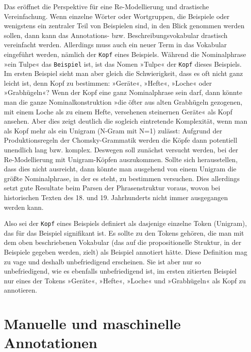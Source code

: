\documentclass{article}
\newcommand*{\vokabular}{\texttt}%
\begin{document}
Das eröffnet die Perspektive für eine Re-Modellierung und drastische
Vereinfachung. Wenn einzelne Wörter oder Wortgruppen, die Beispiele
oder wenigstens ein zentraler Teil von Beispielen sind, in den Blick
genommen werden sollen, dann kann das Annotations-
bzw. Beschreibungsvokabular drastisch vereinfacht werden. Allerdings
muss auch ein neuer Term in das Vokabular eingeführt werden, nämlich
der \vokabular{Kopf} eines Beispiels. Während die Nominalphrase »ein
Tulpe« das \vokabular{Beispiel} ist, ist das Nomen »Tulpe« der
\vokabular{Kopf} dieses Beispiels. Im ersten Beispiel sieht man aber
gleich die Schwierigkeit, dass es oft nicht ganz leicht ist, denn Kopf
zu bestimmen: »Geräte«, »Hefte«, »Loche« oder »Grabhügeln«? Wenn der
Kopf eine ganz Nominalphrase sein darf, dann könnte man die ganze
Nominalkonstruktion »die öfter aus alten Grabhügeln gezogenen, mit
einem Loche als zu einem Hefte, versehenen steinernen Geräte« als Kopf
ansehen. Aber dies zeigt deutlich die sogleich eintretende
Komplexität, wenn man als Kopf mehr als ein Unigram (N-Gram mit N=1)
zulässt: Aufgrund der Produktionsregeln der Chomsky-Grammatik werden
die Köpfe dann potentiell unendlich lang bzw. komplex. Deswegen soll
zunächst versucht werden, bei der Re-Modellierung mit Unigram-Köpfen
auszukommen. Sollte sich herausstellen, dass dies nicht ausreicht,
dann könnte man ausgehend von einem Unigram die größte Nominalphrase,
in der es steht, zu bestimmen versuchen. Dies allerdings setzt gute
Resultate beim Parsen der Phrasenstruktur voraus, wovon bei
historischen Texten des 18. und 19. Jahrhunderts nicht immer
ausgegangen werden kann.

Also sei der \vokabular{Kopf} eines Beispiels definiert als dasjenige
einzelne Token (Unigram), das für das Beispiel signifikant ist. Es
sollte zu den Tokens gehören, die man mit dem oben beschriebenen
Vokabular (das auf die propositionelle Struktur, in der Beispiele
gegeben werden, zielt) als Beispiel annotiert hätte. Diese Definition
mag zu vage und deshalb unbefriedigend erscheinen. Sie ist aber nur so
unbefriedigend, wie es ebenfalls unbefriedigend ist, im ersten
zitierten Beispiel nur eines der Tokens »Geräte«, »Hefte«, »Loche« und
»Grabhügeln« als Kopf zu annotieren.


\section{Manuelle und maschinelle Annotationen}
\end{document}
